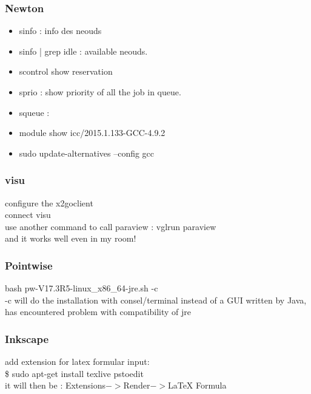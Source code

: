 \documentclass{beamer}
\begin{document}

\begin{frame}
\frametitle{Newton}
\begin{itemize}

	\item sinfo : info des neouds

	\item	sinfo | grep idle : available neouds.

	\item	scontrol show reservation 

	\item	sprio : show priority of all the job in queue.

	\item	squeue :

	\item	module show icc/2015.1.133-GCC-4.9.2

	\item sudo update-alternatives --config gcc

\end{itemize}
\end{frame}


\begin{frame}
\frametitle{visu}
	configure the x2goclient \\
	connect visu \\
	use another command to call paraview : vglrun paraview \\
	
	and it works well even in my room!
\end{frame}


\begin{frame}
\frametitle{Pointwise}
	bash pw-V17.3R5-linux\_x86\_64-jre.sh -c \\
	-c will do the installation with consel/terminal instead of a GUI written by Java, has encountered problem with compatibility of jre
\end{frame}


\begin{frame}
\frametitle{Inkscape}
	add extension for latex formular input:\\
	\$ sudo apt-get install texlive pstoedit \\
	it will then be : Extensions$->$Render$->$LaTeX Formula
\end{frame}
\end{document}
